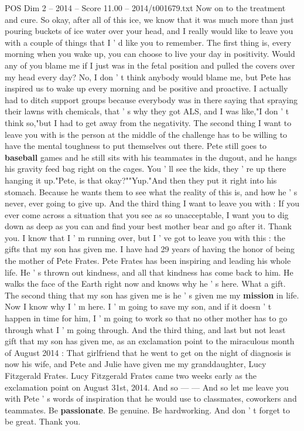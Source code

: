 \begin{textsample}{POS Dim 2 – 2014 – Score 11.00 – 2014/t001679.txt}
Now on to the treatment and cure.
So okay, after all of this ice, we know that it was much more than just pouring buckets of ice water over your head, and I really would like to leave you with a couple of things that I ' d like you to remember.
The first thing is, every morning when you wake up, you can choose to live your day in positivity.
Would any of you blame me if I just was in the fetal position and pulled the covers over my head every day?
No, I don ' t think anybody would blame me, but Pete has inspired us to wake up every morning and be positive and proactive.
I actually had to ditch support groups because everybody was in there saying that spraying their lawns with chemicals, that ' s why they got ALS, and I was like,"I don ' t think so,"but I had to get away from the negativity.
The second thing I want to leave you with is the person at the middle of the challenge has to be willing to have the mental toughness to put themselves out there.
Pete still goes to \textbf{baseball} games and he still sits with his teammates in the dugout, and he hangs his gravity feed bag right on the cages.
You ' ll see the kids, they ' re up there hanging it up."Pete, is that okay?""Yup."And then they put it right into his stomach.
Because he wants them to see what the reality of this is, and how he ' s never, ever going to give up.
And the third thing I want to leave you with : If you ever come across a situation that you see as so unacceptable, I want you to dig down as deep as you can and find your best mother bear and go after it.
Thank you.
I know that I ' m running over, but I ' ve got to leave you with this : the gifts that my son has given me.
I have had 29 years of having the honor of being the mother of Pete Frates.
Pete Frates has been inspiring and leading his whole life.
He ' s thrown out kindness, and all that kindness has come back to him.
He walks the face of the Earth right now and knows why he ' s here.
What a gift.
The second thing that my son has given me is he ' s given me my \textbf{mission} in life.
Now I know why I ' m here.
I ' m going to save my son, and if it doesn ' t happen in time for him, I ' m going to work so that no other mother has to go through what I ' m going through.
And the third thing, and last but not least gift that my son has given me, as an exclamation point to the miraculous month of August 2014 : That girlfriend that he went to get on the night of diagnosis is now his wife, and Pete and Julie have given me my granddaughter, Lucy Fitzgerald Frates.
Lucy Fitzgerald Frates came two weeks early as the exclamation point on August 31st, 2014.
And so — — And so let me leave you with Pete ' s words of inspiration that he would use to classmates, coworkers and teammates.
Be \textbf{passionate}.
Be genuine.
Be hardworking.
And don ' t forget to be great.
Thank you.

\end{textsample}
